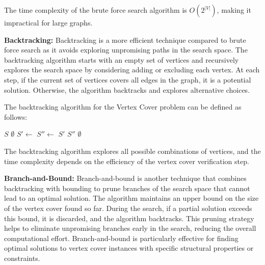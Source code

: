The time complexity of the brute force search algorithm is \(O(2^{|V|})\), making it impractical for large graphs.

\textbf{Backtracking:} Backtracking is a more efficient technique compared to brute force search as it avoids exploring unpromising paths in the search space. The backtracking algorithm starts with an empty set of vertices and recursively explores the search space by considering adding or excluding each vertex. At each step, if the current set of vertices covers all edges in the graph, it is a potential solution. Otherwise, the algorithm backtracks and explores alternative choices.

The backtracking algorithm for the Vertex Cover problem can be defined as follows:
\FloatBarrier
\begin{algorithm}
\caption{Backtracking Vertex Cover}
\begin{algorithmic}[1]
        \State \Return $S$
    \Else
        \State \Return $\emptyset$
    \EndIf
\EndIf
\State $S' \gets$ 
\State $S'' \gets$ 
    \State \Return $S'$
    \State \Return $S''$
\Else
    \State \Return $\emptyset$
\EndIf
\EndFunction
\end{algorithmic}
\end{algorithm}

\FloatBarrier
The backtracking algorithm explores all possible combinations of vertices, and the time complexity depends on the efficiency of the vertex cover verification step.

\textbf{Branch-and-Bound:} Branch-and-bound is another technique that combines backtracking with bounding to prune branches of the search space that cannot lead to an optimal solution. The algorithm maintains an upper bound on the size of the vertex cover found so far. During the search, if a partial solution exceeds this bound, it is discarded, and the algorithm backtracks. This pruning strategy helps to eliminate unpromising branches early in the search, reducing the overall computational effort. Branch-and-bound is particularly effective for finding optimal solutions to vertex cover instances with specific structural properties or constraints.

